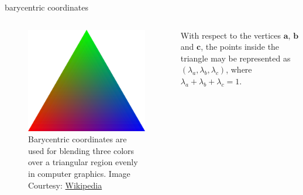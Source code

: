 \documentclass[aspectratio=169,xcolor={dvipsnames,svgnames}]{beamer}
\begin{document}
\begin{frame}[label={sec:org3882b62}]{barycentric coordinates}
\begin{columns}
\begin{column}{.3\columnwidth}
\begin{figure}[htbp]
\centering
\includegraphics[width=.9\linewidth]{images/Barycentric_RGB.svg.png}
\caption{Barycentric coordinates are used for blending three colors over a triangular region evenly in computer graphics. Image Courtesy: \href{https://commons.wikimedia.org/wiki/File:Barycentric\_RGB.svg}{Wikipedia}}
\end{figure}
\end{column}

\begin{column}{.5\columnwidth}
With respect to the vertices \(\mathbf{a}\), \(\mathbf{b}\)
and \(\mathbf{c}\), the points inside the triangle may be
represented as \((\lambda_{a},\lambda_{b},\lambda_{c})\),
where \(\lambda_{a} + \lambda_{b} + \lambda_{c} = 1\).
\end{column}
\end{columns}
\end{frame}
\end{document}
